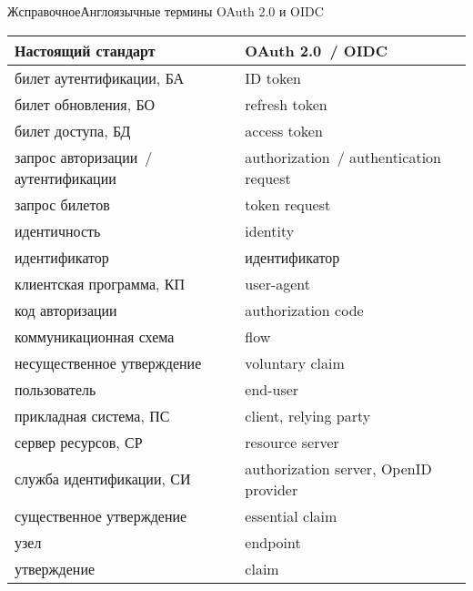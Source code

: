 \begin{appendix}{Ж}{справочное}{Англоязычные термины OAuth 2.0 и OIDC}\label{ENG}

\mbox{}

\begin{center}
\begin{tabular}{|p{8cm}|p{8cm}|}
\hline
Настоящий стандарт & OAuth 2.0~/ OIDC\\
\hline
\hline
билет аутентификации, БА & ID token\\
билет обновления, БО & refresh token\\
билет доступа, БД & access token\\
запрос авторизации~/ аутентификации & 
authorization~/ authentication request\\
запрос билетов & token request\\
идентичность & identity\\
идентификатор & идентификатор\\
клиентская программа, КП & user-agent\\
код авторизации & authorization code\\
коммуникационная схема & flow\\
несущественное утверждение & voluntary claim\\
пользователь & end-user\\
прикладная система, ПС & client, relying party\\
сервер ресурсов, СР & resource server\\
служба идентификации, СИ & authorization server, OpenID provider\\
существенное утверждение & essential claim\\
узел & endpoint\\
утверждение & claim\\
\hline
\end{tabular}
\end{center}

\end{appendix}
